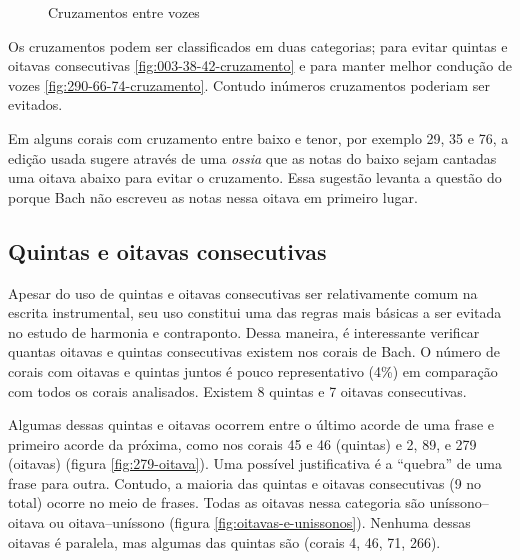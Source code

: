 \begin{figure}[!h]
  \centering
  \caption{Cruzamentos entre vozes}
  \label{fig:coral-003}
\end{figure}

Os cruzamentos podem ser classificados em duas categorias; para evitar
quintas e oitavas consecutivas \ref{fig:003-38-42-cruzamento} e para
manter melhor condução de vozes \ref{fig:290-66-74-cruzamento}.
Contudo inúmeros cruzamentos poderiam ser evitados.

Em alguns corais com cruzamento entre baixo e tenor, por exemplo 29,
35 e 76, a edição usada sugere através de uma \textit{ossia} que as
notas do baixo sejam cantadas uma oitava abaixo para evitar o
cruzamento. Essa sugestão levanta a questão do porque Bach não
escreveu as notas nessa oitava em primeiro lugar.

\subsection{Quintas e oitavas consecutivas}
\label{sec:quintas-e-oitavas}

Apesar do uso de quintas e oitavas consecutivas ser relativamente
comum na escrita instrumental, seu uso constitui uma das regras mais
básicas a ser evitada no estudo de harmonia e contraponto. Dessa
maneira, é interessante verificar quantas oitavas e quintas
consecutivas existem nos corais de Bach. O número de corais com
oitavas e quintas juntos é pouco representativo (4\%) em comparação
com todos os corais analisados. Existem 8 quintas e 7 oitavas
consecutivas.

Algumas dessas quintas e oitavas ocorrem entre o último acorde de uma
frase e primeiro acorde da próxima, como nos corais 45 e 46 (quintas)
e 2, 89, e 279 (oitavas) (figura \ref{fig:279-oitava}). Uma possível
justificativa é a ``quebra'' de uma frase para outra. Contudo, a
maioria das quintas e oitavas consecutivas (9 no total) ocorre no meio
de frases. Todas as oitavas nessa categoria são uníssono--oitava ou
oitava--uníssono (figura \ref{fig:oitavas-e-unissonos}). Nenhuma
dessas oitavas é paralela, mas algumas das quintas são (corais 4, 46,
71, 266).

